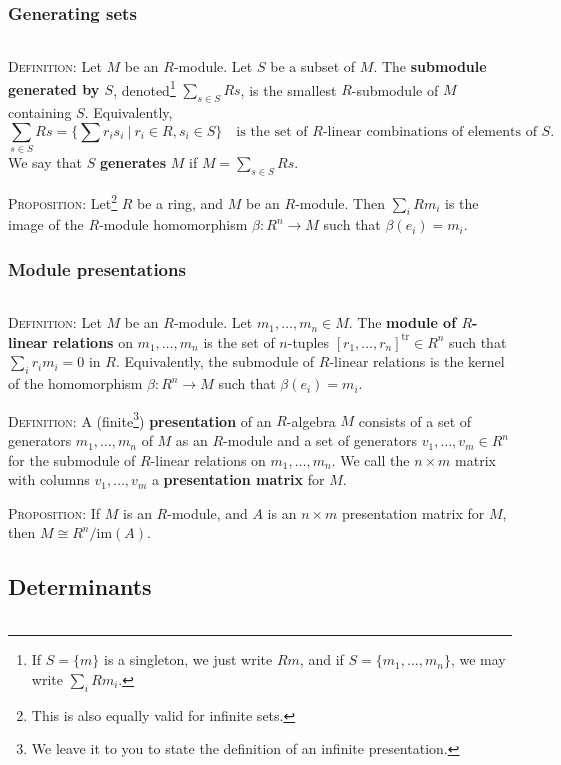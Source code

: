 \documentclass[12pt]{amsart}
\newcommand{\tr}{\mathrm{tr}}
\newcommand{\im}{\mathrm{im}}
\newcommand{\0}{$\phantom{.}$}
\newcommand{\1}{\mathbbm{1}}
\newcommand{\sssec}[1]{\subsubsection*{#1}}
\begin{document}
\sssec{Generating sets} \0

\noindent \textsc{Definition:} Let $M$ be an $R$-module. Let $S$ be a subset of $M$. The \textbf{submodule generated by $S$}, denoted\footnote{If $S=\{m\}$ is a singleton, we just write $Rm$, and if $S=\{m_1,\dots,m_n\}$, we may write $\sum_i R m_i$.} $\sum_{s\in S} Rs$, is the smallest $R$-submodule of $M$ containing $S$. Equivalently, 
\[ \sum_{s\in S} Rs = \big\{ \sum r_i s_i \ | \ r_i \in R, s_i \in S\big\} \quad \text{is the set of $R$-linear combinations of elements of $S$.}\]
We say that $S$ \textbf{generates} $M$ if $M=\sum_{s\in S} Rs$.

\vspace{1mm}

\noindent \textsc{Proposition:} Let\footnote{This is also equally valid for infinite sets.} $R$ be a ring, and $M$ be an $R$-module. Then $\sum_{i} R m_i$ is the image of the $R$-module homomorphism $\beta: R^n \to M$ such that $\beta(e_i)= m_i$.


\sssec{Module presentations}\0

\noindent \textsc{Definition:} Let $M$ be an $R$-module. Let $m_1,\dots,m_n\in M$. The \textbf{module of $R$-linear relations} on $m_1,\dots,m_n$ is the set of $n$-tuples $[r_1,\dots,r_n]^\tr \in R^n$ such that $\sum_i r_i m_i=0$ in $R$. Equivalently, the submodule of $R$-linear relations is the kernel of the homomorphism $\beta: R^n \to M$ such that $\beta(e_i)= m_i$.

\vspace{1mm}

\noindent \textsc{Definition:} A (finite\footnote{We leave it to you to state the definition of an infinite presentation.}) \textbf{presentation} of an $R$-algebra $M$ consists of a set of generators $m_1,\dots,m_n$ of $M$ as an $R$-module and a set of generators $v_1,\dots, v_m\in R^n$ for the submodule of $R$-linear relations on $m_1,\dots,m_n$. We call the $n \times m$ matrix with columns $v_1,\dots, v_m$ a \textbf{presentation matrix} for $M$. 

\vspace{1mm}

\noindent \textsc{Proposition:} If $M$ is an $R$-module, and $A$ is an $n\times m$ presentation matrix for $M$, then $M\cong R^n / \im(A)$.


\newpage




\subsection{Determinants} \0
\end{document}
